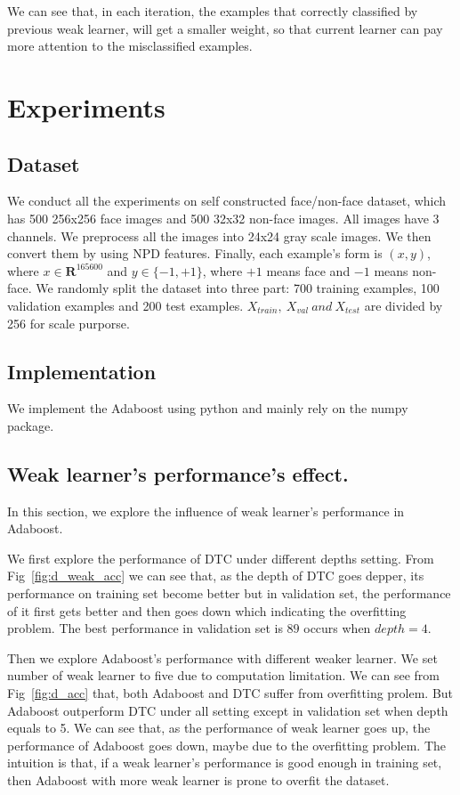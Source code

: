 \documentclass[journal, a4paper]{IEEEtran}
\begin{document}
We can see that, in each iteration, the examples that correctly classified by previous weak learner, will get a smaller weight, so that current learner can pay more attention to the misclassified examples. 


\section{Experiments}
\subsection{Dataset}
We conduct all the experiments on self constructed face/non-face dataset, which has 500 256x256 face images and 500 32x32 non-face images. All images have 3 channels. We preprocess all the images into 24x24 gray scale images. We then convert them by using NPD features. Finally, each example's form is $(x, y)$, where $x \in \mathbf{R}^{165600}$ and $y \in \{-1, +1\}$, where $+1$ means face and $-1$ means non-face. We randomly split the dataset into three part: 700 training examples, 100 validation examples and 200 test examples. $X_{train},~X_{val}~and~X_{test} $ are divided by 256 for scale purporse.

\subsection{Implementation}
We implement the Adaboost using python and mainly rely on the numpy package.

\subsection{Weak learner's performance's effect.}
In this section, we explore the influence of weak learner's performance in Adaboost. \par 
We first explore the performance of DTC under different depths setting. From Fig~\ref{fig:d_weak_acc} we can see that, as the depth of DTC goes depper, its performance on training set become better but in validation set, the performance of it first gets better and then goes down which indicating the overfitting problem. The best performance in validation set is $89$ occurs when $depth = 4$. \par
Then we explore Adaboost's performance with different weaker learner.  We set number of weak learner to five due to computation limitation. We can see from Fig~\ref{fig:d_acc} that, both Adaboost and DTC suffer from overfitting prolem. But Adaboost outperform DTC under all setting except in validation set when depth equals to 5. We can see that, as the performance of weak learner goes up, the performance of Adaboost goes down, maybe due to the overfitting problem. The intuition is that, if a weak learner's performance is good enough in training set, then Adaboost with more weak learner is prone to overfit the dataset.  \par
\end{document}
